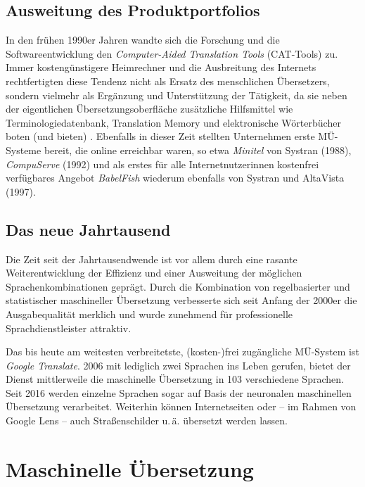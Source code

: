 \subsection{Ausweitung des Produktportfolios}
In den frühen 1990er Jahren wandte sich die Forschung und die Softwareentwicklung den \emph{Computer-Aided Translation Tools} (CAT-Tools) zu. Immer kostengünstigere Heimrechner und die Ausbreitung des Internets rechtfertigten diese Tendenz nicht als Ersatz des menschlichen Übersetzers, sondern vielmehr als Ergänzung und Unterstützung der Tätigkeit, da sie neben der eigentlichen Übersetzungsoberfläche zusätzliche Hilfsmittel wie Terminologiedatenbank, Translation Memory und elektronische Wörterbücher boten (und bieten) \citep[38]{bowker_machine_2019}. Ebenfalls in dieser Zeit stellten Unternehmen erste MÜ-Systeme bereit, die online erreichbar waren, so etwa \emph{Minitel} von Systran (1988), \emph{CompuServe} (1992) und als erstes für alle Internetnutzer{\textperiodcentered}innen kostenfrei verfügbares Angebot \emph{BabelFish} wiederum ebenfalls von Systran und AltaVista (1997).

\subsection{Das neue Jahrtausend}
Die Zeit seit der Jahrtausendwende ist vor allem durch eine rasante Weiterentwicklung der Effizienz und einer Ausweitung der möglichen Sprachenkombinationen geprägt. Durch die Kombination von regelbasierter und statistischer maschineller Übersetzung verbesserte sich seit Anfang der 2000er die Ausgabequalität merklich und wurde zunehmend für professionelle Sprachdienstleister attraktiv.

Das bis heute am weitesten verbreitetste, (kosten-)frei zugängliche MÜ-Sys\-tem ist \emph{Google Translate}. 2006 mit lediglich zwei Sprachen ins Leben gerufen, bietet der Dienst mittlerweile die maschinelle Übersetzung in 103 verschiedene Sprachen. Seit 2016 werden einzelne Sprachen sogar auf Basis der neuronalen maschinellen Übersetzung verarbeitet. Weiterhin können Internetseiten oder -- im Rahmen von Google Lens -- auch Straßenschilder u.\,ä. übersetzt werden lassen.


\section{Maschinelle Übersetzung}

